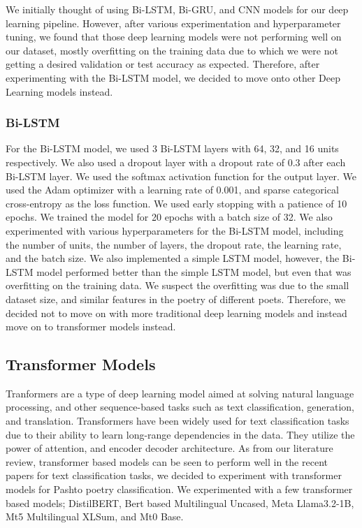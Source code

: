 We initially thought of using Bi-LSTM, Bi-GRU, and CNN models for our deep learning pipeline. However, after various experimentation and hyperparameter tuning, we found that those deep learning models were not performing well on our dataset, mostly overfitting on the training data due to which we were not getting a desired validation or test accuracy as expected. Therefore, after experimenting with the Bi-LSTM model, we decided to move onto other Deep Learning models instead. 

\subsubsection{Bi-LSTM}
For the Bi-LSTM model, we used 3 Bi-LSTM layers with 64, 32, and 16 units respectively. We also used a dropout layer with a dropout rate of 0.3 after each Bi-LSTM layer. We used the softmax activation function for the output layer. We used the Adam optimizer with a learning rate of 0.001, and sparse categorical cross-entropy as the loss function. We used early stopping with a patience of 10 epochs. We trained the model for 20 epochs with a batch size of 32. We also experimented with various hyperparameters for the Bi-LSTM model, including the number of units, the number of layers, the dropout rate, the learning rate, and the batch size. We also implemented a simple LSTM model, however, the Bi-LSTM model performed better than the simple LSTM model, but even that was overfitting on the training data. We suspect the overfitting was due to the small dataset size, and similar features in the poetry of different poets. Therefore, we decided not to move on with more traditional deep learning models and instead move on to transformer models instead.


\subsection{Transformer Models}

Tranformers are a type of deep learning model aimed at solving natural language processing, and other sequence-based tasks such as text classification, generation, and translation. Transformers have been widely used for text classification tasks due to their ability to learn long-range dependencies in the data. They utilize the power of attention, and encoder decoder architecture. As from our literature review, transformer based models can be seen to perform well in the recent papers for text classification tasks, we decided to experiment with transformer models for Pashto poetry classification. We experimented with a few transformer based models; DistilBERT, Bert based Multilingual Uncased, Meta Llama3.2-1B, Mt5 Multilingual XLSum, and Mt0 Base.

